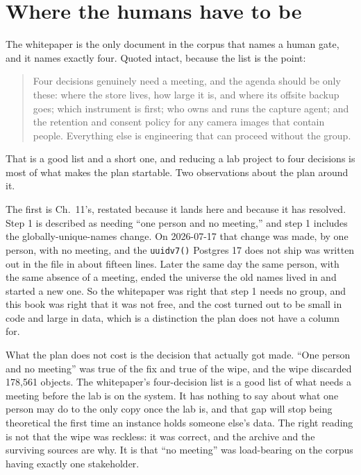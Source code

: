 \section{Where the humans have to be}

The whitepaper is the only document in the corpus that names a human gate, and it names exactly four. Quoted intact, because the list is the point:

\begin{quote}
Four decisions genuinely need a meeting, and the agenda should be only these: where the store lives, how large it is, and where its offsite backup goes; which instrument is first; who owns and runs the capture agent; and the retention and consent policy for any camera images that contain people. Everything else is engineering that can proceed without the group.
\end{quote}

That is a good list and a short one, and reducing a lab project to four decisions is most of what makes the plan startable. Two observations about the plan around it.

The first is Ch.~11's, restated because it lands here and because it has resolved. Step 1 is described as needing ``one person and no meeting,'' and step 1 includes the globally-unique-names change. On 2026-07-17 that change was made, by one person, with no meeting, and the \texttt{uuidv7()} Postgres 17 does not ship was written out in the file in about fifteen lines. Later the same day the same person, with the same absence of a meeting, ended the universe the old names lived in and started a new one. So the whitepaper was right that step 1 needs no group, and this book was right that it was not free, and the cost turned out to be small in code and large in data, which is a distinction the plan does not have a column for.

What the plan does not cost is the decision that actually got made. ``One person and no meeting'' was true of the fix and true of the wipe, and the wipe discarded 178,561 objects. The whitepaper's four-decision list is a good list of what needs a meeting before the lab is on the system. It has nothing to say about what one person may do to the only copy once the lab is, and that gap will stop being theoretical the first time an instance holds someone else's data. The right reading is not that the wipe was reckless: it was correct, and the archive and the surviving sources are why. It is that ``no meeting'' was load-bearing on the corpus having exactly one stakeholder.

